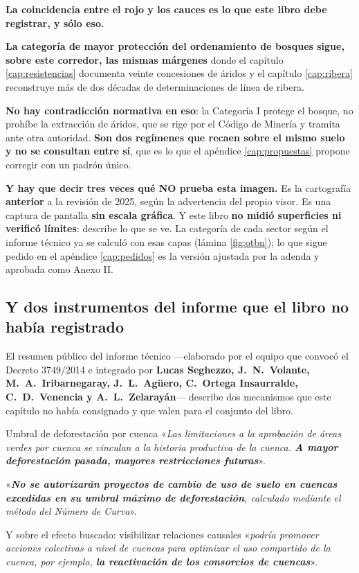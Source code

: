\begin{cautela}
\textbf{La coincidencia entre el rojo y los cauces es lo que este libro debe registrar, y sólo
eso.}

\textbf{La categoría de mayor protección del ordenamiento de bosques sigue, sobre este
corredor, las mismas márgenes} donde el capítulo \ref{cap:resistencias} documenta veinte
concesiones de áridos y el capítulo \ref{cap:ribera} reconstruye más de dos décadas de
determinaciones de línea de ribera.

\textbf{No hay contradicción normativa en eso}: la Categoría I protege el bosque, no prohíbe la
extracción de áridos, que se rige por el Código de Minería y tramita ante otra autoridad.
\textbf{Son dos regímenes que recaen sobre el mismo suelo y no se consultan entre sí}, que es lo
que el apéndice \ref{cap:propuestas} propone corregir con un padrón único.

\textbf{Y hay que decir tres veces qué NO prueba esta imagen.} Es la cartografía
\textbf{anterior} a la revisión de 2025, según la advertencia del propio visor. Es una captura
de pantalla \textbf{sin escala gráfica}. Y este libro \textbf{no midió superficies ni verificó
límites}: describe lo que se ve. La categoría de cada sector según el informe técnico ya se calculó con esas capas (lámina \ref{fig:otbn}); lo que sigue pedido en el apéndice \ref{cap:pedidos} es la versión ajustada por la adenda y aprobada como Anexo II.
\end{cautela}

\subsection*{Y dos instrumentos del informe que el libro no había registrado}

El resumen público del informe técnico ---elaborado por el equipo que convocó el Decreto
3749/2014 e integrado por \textbf{Lucas Seghezzo, J.\ N.\ Volante, M.\ A.\ Iribarnegaray, J.\
L.\ Agüero, C.\ Ortega Insaurralde, C.\ D.\ Venencia y A.\ L.\ Zelarayán}--- describe dos
mecanismos que este capítulo no había consignado y que valen para el conjunto del libro.

\begin{ficha}{Umbral de deforestación por cuenca}
«\textit{Las limitaciones a la aprobación de áreas verdes por cuenca se vinculan a la historia
productiva de la cuenca. \textbf{A mayor deforestación pasada, mayores restricciones
futuras}}».

«\textit{\textbf{No se autorizarán proyectos de cambio de uso de suelo en cuencas excedidas en
su umbral máximo de deforestación}, calculado mediante el método del Número de Curva}».

Y sobre el efecto buscado: visibilizar relaciones causales «\textit{podría promover acciones
colectivas a nivel de cuencas para optimizar el uso compartido de la cuenca, por ejemplo,
\textbf{la reactivación de los consorcios de cuencas}}».
\end{ficha}

